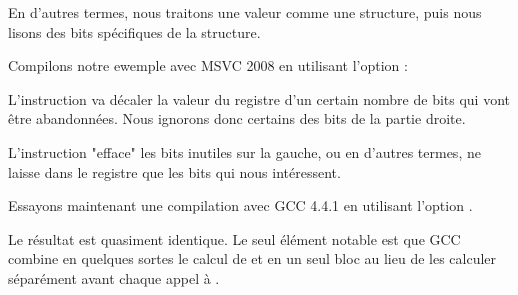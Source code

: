 En d'autres termes, nous traitons une valeur \Tint comme une structure, puis nous lisons des bits spécifiques 
de la structure.


Compilons notre ewemple avec MSVC 2008 en utilisant l'option \Ox:




L'instruction  va décaler la valeur du registre \EAX d'un certain nombre de bits qui vont être 
abandonnées. Nous ignorons donc certains des bits de la partie droite.


L'instruction \AND "efface" les bits inutiles sur la gauche, ou en d'autres termes, ne laisse dans le 
registre \EAX que les bits qui nous intéressent.




Essayons maintenant une compilation avec GCC 4.4.1 en utilisant l'option \Othree.



Le résultat est quasiment identique.
Le seul élément notable est que GCC combine en quelques sortes le calcul de  et 
 en un seul bloc au lieu de les calculer séparément avant chaque appel à \printf.
